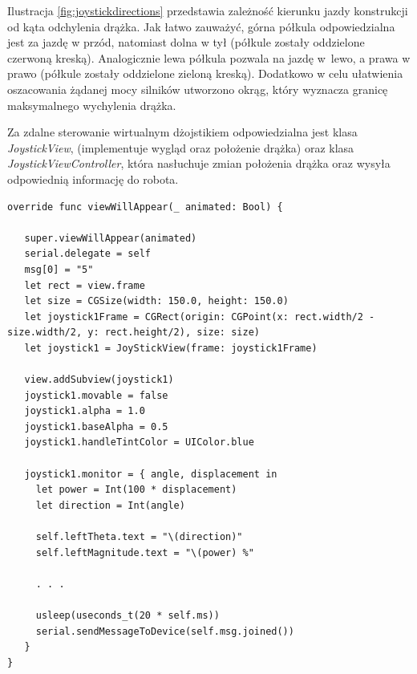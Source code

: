 Ilustracja \ref{fig:joystickdirections} przedstawia zależność kierunku jazdy konstrukcji od kąta odchylenia drążka. Jak łatwo zauważyć, górna półkula odpowiedzialna jest za jazdę w przód, natomiast dolna w tył (półkule zostały oddzielone czerwoną kreską). Analogicznie lewa półkula pozwala na jazdę w~lewo, a prawa w prawo (półkule zostały oddzielone zieloną kreską). Dodatkowo w celu ułatwienia oszacowania żądanej mocy silników utworzono okrąg, który wyznacza granicę maksymalnego wychylenia drążka.

Za zdalne sterowanie wirtualnym dżojstikiem odpowiedzialna jest klasa \textit{JoystickView}, (implementuje wygląd oraz położenie drążka) oraz klasa  \textit{JoystickViewController}, która nasłuchuje zmian położenia drążka oraz wysyła odpowiednią informację do robota. 

\begin{minipage}{\textwidth}
	\begin{lstlisting}[label=joystickcontrol,caption=Metoda klasy JoystickViewController.]
override func viewWillAppear(_ animated: Bool) {
    
   super.viewWillAppear(animated)
   serial.delegate = self
   msg[0] = "5"
   let rect = view.frame
   let size = CGSize(width: 150.0, height: 150.0)
   let joystick1Frame = CGRect(origin: CGPoint(x: rect.width/2 - size.width/2, y: rect.height/2), size: size)
   let joystick1 = JoyStickView(frame: joystick1Frame)
    
   view.addSubview(joystick1)
   joystick1.movable = false
   joystick1.alpha = 1.0
   joystick1.baseAlpha = 0.5 
   joystick1.handleTintColor = UIColor.blue
    
   joystick1.monitor = { angle, displacement in
     let power = Int(100 * displacement)
     let direction = Int(angle)

     self.leftTheta.text = "\(direction)"
     self.leftMagnitude.text = "\(power) %"
	
	 . . .
	
     usleep(useconds_t(20 * self.ms))
     serial.sendMessageToDevice(self.msg.joined())
   }
}  
	\end{lstlisting}
\end{minipage}

